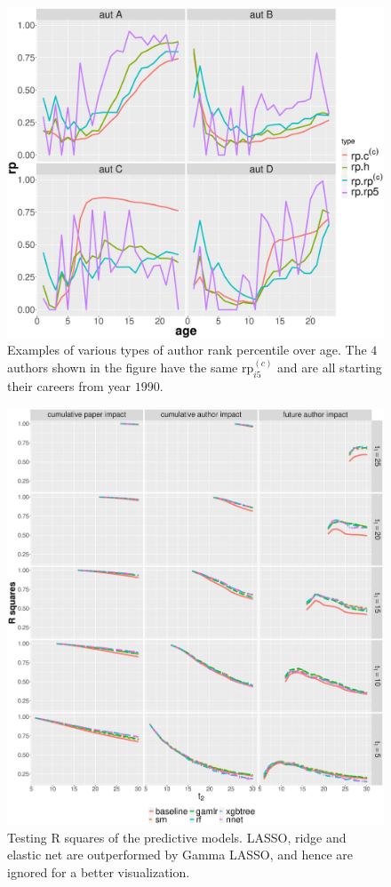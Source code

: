 \begin{figure}[ht!]
    \centering
    \includegraphics[width=\textwidth]{figures/exploratory/autrp_examples.eps}
    \caption{Examples of various types of author rank percentile over age. The $4$ authors shown in the figure have the same $\text{rp}^{(c)}_{i 5}$ and are all starting their careers from year $1990$. }
    \label{fig:aut_examples}
\end{figure}
\fi

\begin{figure}[ht!]
    \centering
    \includegraphics[width=\textwidth]{figures/pred_model/r2_diff.eps}
    \caption{Testing R squares of the predictive models. LASSO, ridge and elastic net are outperformed by Gamma LASSO, and hence are ignored for a better visualization.}
    \label{fig:pred_r2}
\end{figure}


